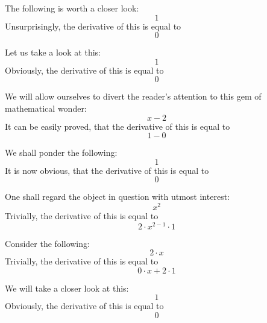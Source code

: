 \documentclass{article}
\begin{document}
The following is worth a closer look:
\begin{equation}
1 
\end{equation}
Unsurprisingly, the derivative of this is equal to
\begin{equation}
0 
\end{equation}

Let us take a look at this:
\begin{equation}
1 
\end{equation}
Obviously, the derivative of this is equal to
\begin{equation}
0 
\end{equation}

We will allow ourselves to divert the reader's attention to this gem of mathematical wonder:
\begin{equation}
x - 2 
\end{equation}
It can be easily proved, that the derivative of this is equal to
\begin{equation}
1 - 0 
\end{equation}

We shall ponder the following:
\begin{equation}
1 
\end{equation}
It is now obvious, that the derivative of this is equal to
\begin{equation}
0 
\end{equation}

One shall regard the object in question with utmost interest:
\begin{equation}
x ^{2 } 
\end{equation}
Trivially, the derivative of this is equal to
\begin{equation}
2 \cdot x ^{2 - 1 } \cdot 1 
\end{equation}

Consider the following:
\begin{equation}
2 \cdot x 
\end{equation}
Trivially, the derivative of this is equal to
\begin{equation}
0 \cdot x + 2 \cdot 1 
\end{equation}

We will take a closer look at this:
\begin{equation}
1 
\end{equation}
Obviously, the derivative of this is equal to
\begin{equation}
0 
\end{equation}
\end{document}
